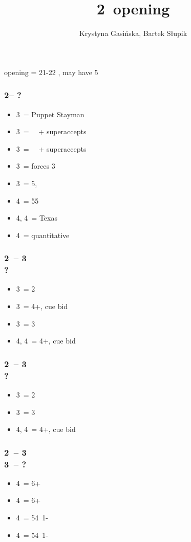 \documentclass[12pt, a4paper]{article}
\title{2\ntx\ opening}
\author{Krystyna Gasińska, Bartek Słupik}
\begin{document}
\maketitle


\alrts{2\nt} opening = 21-22 \bal, may have 5\major

\subsubsection*{2\nt -- ?}
\begin{itemize}
    \item 3\clubs\ = Puppet Stayman
    \item 3\diams\ = \then\ \hearts\ + superaccepts
    \item 3\hearts\ = \then\ \spades\ + superaccepts
    \item 3\spades\ = forces 3\nt
    \item 3\nt\ = 5\hearts, \nf \imp
    \item 4\clubs\ = 55\major
    \item 4\diams, 4\hearts\ = Texas
    \item 4\nt\ = quantitative
\end{itemize}

\subsubsection*{2\ntx\ -- 3\diams \\ ?}
\begin{itemize}
    \item 3\hearts\ = 2\hearts
    \item 3\spades\ = 4+\hearts, cue bid
    \item 3\nt\ = 3\spades
    \item 4\clubs, 4\diams\ = 4+\hearts, cue bid
\end{itemize}

\subsubsection*{2\ntx\ -- 3\hearts \\ ?}
\begin{itemize}
    \item 3\spades\ = 2\spades
    \item 3\nt\ = 3\spades
    \item 4\clubs, 4\diams\ = 4+\spades, cue bid
\end{itemize}

\subsubsection*{2\ntx\ -- 3\spades \\ 3\nt\ -- ?}
\begin{itemize}
    \item 4\clubs\ = 6+\clubs
    \item 4\diams\ = 6+\diams
    \item 4\hearts\ = 54\minor\ 1-\hearts
    \item 4\spades\ = 54\minor\ 1-\spades
\end{itemize}

\end{document}

